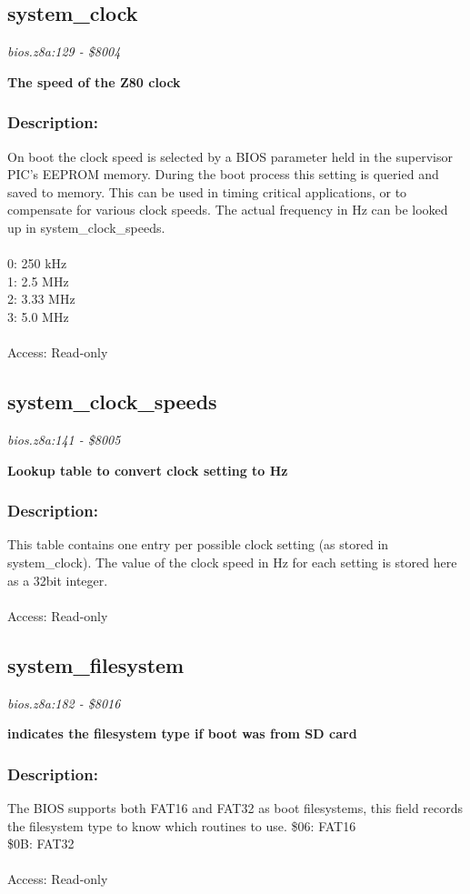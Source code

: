 \subsection{system\_clock}
\textit{bios.z8a:129 - \$8004}

\noindent
\textbf{The speed of the Z80 clock}

\subsubsection{Description:}
 On boot the clock speed is selected by a BIOS parameter held in the supervisor PIC's EEPROM memory.  During the boot process this setting is  queried and saved to memory.  This can be used in timing critical applications, or to compensate for various clock speeds.  The actual frequency in Hz can be looked up in system\_clock\_speeds.\\\\ 0: 250 kHz\\ 1: 2.5 MHz\\ 2: 3.33 MHz\\ 3: 5.0 MHz\\\\ Access: Read-only

\subsection{system\_clock\_speeds}
\textit{bios.z8a:141 - \$8005}

\noindent
\textbf{Lookup table to convert clock setting to Hz}

\subsubsection{Description:}
 This table contains one entry per possible clock setting (as stored in system\_clock).  The value of the clock speed in Hz for each setting is stored here as a 32bit integer.\\\\ Access: Read-only

\subsection{system\_filesystem}
\textit{bios.z8a:182 - \$8016}

\noindent
\textbf{indicates the filesystem type if boot was from SD card}

\subsubsection{Description:}
 The BIOS supports both FAT16 and FAT32 as boot filesystems, this field records the filesystem type to know which routines to use. \$06: FAT16\\ \$0B: FAT32\\\\ Access: Read-only

